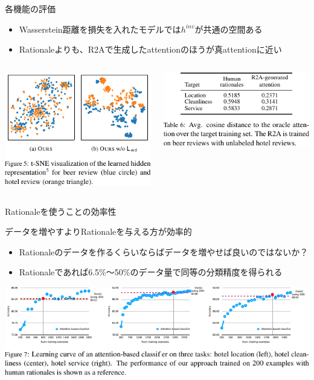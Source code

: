 \begin{frame}{各機能の評価}
\begin{itemize}
\item Wasserstein距離を損失を入れたモデルでは$h^{inv}$が共通の空間ある
\item Rationaleよりも、R2Aで生成したattentionのほうが真attentionに近い
\end{itemize}
\begin{columns}[onlytextwidth]
\begin{column}{0.48\linewidth}
\vspace*{-8pt}
\includegraphics{fig/figure5.pdf}
\end{column}
\begin{column}{0.48\linewidth}
\vspace*{-8pt}
\includegraphics{fig/table6.pdf}
\end{column}
\end{columns}
\end{frame}

\begin{frame}{Rationaleを使うことの効率性}
\begin{lead}
    データを増やすよりRationaleを与える方が効率的
\end{lead}
\begin{itemize}
\item Rationaleのデータを作るくらいならばデータを増やせば良いのではないか？
\item Rationaleであれば6.5\%〜50\%のデータ量で同等の分類精度を得られる
\end{itemize}
\vspace*{-8pt}
\includegraphics{fig/figure7.pdf}
\end{frame}

